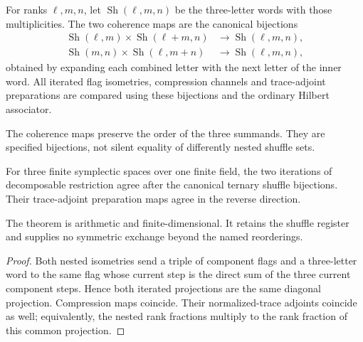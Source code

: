 \begin{definition}
For ranks $\ell,m,n$, let $\operatorname{Sh}(\ell,m,n)$ be the three-letter
words with those multiplicities.  The two coherence maps are the canonical
bijections
\begin{align*}
 \operatorname{Sh}(\ell,m)\times\operatorname{Sh}(\ell+m,n)
   &\longrightarrow\operatorname{Sh}(\ell,m,n),\\
 \operatorname{Sh}(m,n)\times\operatorname{Sh}(\ell,m+n)
   &\longrightarrow\operatorname{Sh}(\ell,m,n),
\end{align*}
obtained by expanding each combined letter with the next letter of the inner
word.  All iterated flag isometries, compression channels and trace-adjoint
preparations are compared using these bijections and the ordinary Hilbert
associator.
\end{definition}
\begin{scope}
The coherence maps preserve the order of the three summands.  They are
specified bijections, not silent equality of differently nested shuffle sets.
\end{scope}

\begin{theorem}
{\normalfont\statusProved}\quad
For three finite symplectic spaces over one finite field, the two iterations
of decomposable restriction agree after the canonical ternary shuffle
bijections.  Their trace-adjoint preparation maps agree in the reverse
direction.
\end{theorem}
\begin{scope}
The theorem is arithmetic and finite-dimensional.  It retains the shuffle
register and supplies no symmetric exchange beyond the named reorderings.
\end{scope}
\begin{proof}
Both nested isometries send a triple of component flags and a three-letter
word to the same flag whose current step is the direct sum of the three
current component steps.  Hence both iterated projections are the same
diagonal projection.  Compression maps coincide.  Their normalized-trace
adjoints coincide as well; equivalently, the nested rank fractions multiply
to the rank fraction of this common projection.
\end{proof}

